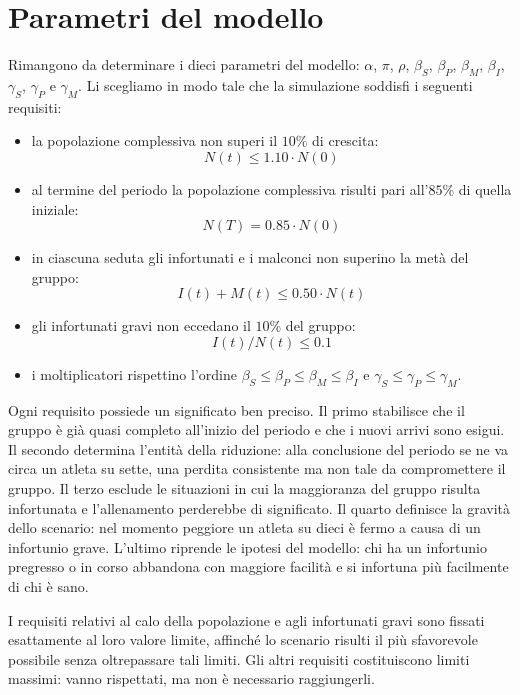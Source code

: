 \section{Parametri del modello}

Rimangono da determinare i dieci parametri del modello: $\alpha$, $\pi$, $\rho$, $\beta_S$, $\beta_P$, $\beta_M$, $\beta_I$, $\gamma_S$, $\gamma_P$ e $\gamma_M$. Li scegliamo in modo tale che la simulazione soddisfi i seguenti requisiti:
\begin{itemize}
    \item la popolazione complessiva non superi il $10\%$ di crescita:
        \[
            N(t) \leq 1.10 \cdot N(0)
        \]
    \item al termine del periodo la popolazione complessiva risulti pari all'$85\%$ di quella iniziale:
        \[
            N(T) = 0.85 \cdot N(0)
        \]
    \item in ciascuna seduta gli infortunati e i malconci non superino la metà del gruppo:
        \[
            I(t) + M(t) \leq 0.50 \cdot N(t)
        \]
    \item gli infortunati gravi non eccedano il $10\%$ del gruppo:
        \[
            I(t) / N(t) \leq 0.1
        \]
    \item i moltiplicatori rispettino l'ordine $\beta_S \leq \beta_P \leq \beta_M \leq \beta_I$ e $\gamma_S \leq \gamma_P \leq \gamma_M$.
\end{itemize}

Ogni requisito possiede un significato ben preciso. Il primo stabilisce che il gruppo è già quasi completo all'inizio del periodo e che i nuovi arrivi sono esigui. Il secondo determina l'entità della riduzione: alla conclusione del periodo se ne va circa un atleta su sette, una perdita consistente ma non tale da compromettere il gruppo. Il terzo esclude le situazioni in cui la maggioranza del gruppo risulta infortunata e l'allenamento perderebbe di significato. Il quarto definisce la gravità dello scenario: nel momento peggiore un atleta su dieci è fermo a causa di un infortunio grave. L'ultimo riprende le ipotesi del modello: chi ha un infortunio pregresso o in corso abbandona con maggiore facilità e si infortuna più facilmente di chi è sano. \par

I requisiti relativi al calo della popolazione e agli infortunati gravi sono fissati esattamente al loro valore limite, affinché lo scenario risulti il più sfavorevole possibile senza oltrepassare tali limiti. Gli altri requisiti costituiscono limiti massimi: vanno rispettati, ma non è necessario raggiungerli.

